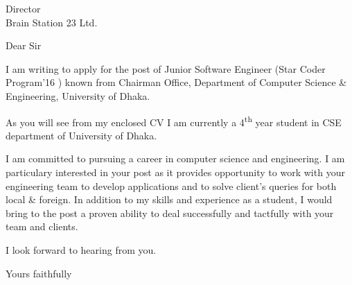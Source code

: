 \documentclass{letter}
\begin{document}
\begin{letter}{Director\\Brain Station 23 Ltd.}
  \opening{Dear Sir}

  I am writing to apply for the post of Junior Software Engineer (Star Coder Program'16 ) known from Chairman Office, Department of Computer Science \& Engineering, University of Dhaka.

As you will see from my enclosed CV I am currently a 4\textsuperscript{th} year student in CSE department of University of Dhaka.

I am committed to pursuing a career in computer science and engineering. I am particulary interested in your post as it provides opportunity to work with your engineering team to develop applications and to solve client’s queries for both local \& foreign. In addition to my skills and experience as a student, I would bring to the post a proven ability to deal successfully and tactfully with your team and clients.

  I look forward to hearing from you.
  \closing{Yours faithfully}
\end{letter}
\end{document}

